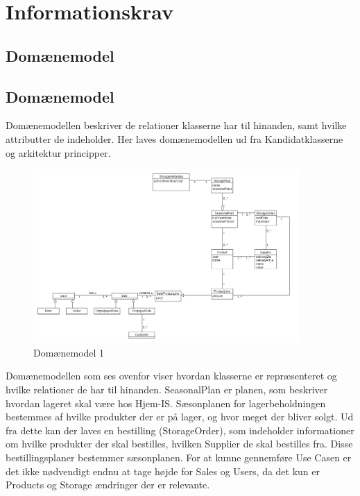 \section{Informationskrav}\label{sec:informations-krav}

\subsection{Domænemodel}

\subsection{Domænemodel}\label{Domainmodel}
Domænemodellen beskriver de relationer klasserne har til hinanden, samt hvilke attributter de indeholder. Her laves domænemodellen ud fra Kandidatklasserne og arkitektur principper.

\begin{figure}[H]
    \centering
    \includegraphics[width=0.9\textwidth]{figures/krav/domain_model_1.png}
    \caption{Domænemodel 1}
    \label{fig:domain_model}
\end{figure}

Domænemodellen som ses ovenfor viser hvordan klasserne er repræsenteret og hvilke relationer de har til hinanden. SeasonalPlan er planen, som beskriver hvordan lageret skal være hos Hjem-IS. Sæsonplanen for lagerbeholdningen bestemmes af hvilke produkter der er på lager, og hvor meget der bliver solgt. Ud fra dette kan der laves en bestilling (StorageOrder), som indeholder informationer om hvilke produkter der skal bestilles, hvilken Supplier de skal bestilles fra. Disse bestillingsplaner bestemmer sæsonplanen.
For at kunne gennemføre Use Casen er det ikke nødvendigt endnu at tage højde for Sales og Users, da det kun er Products og Storage ændringer der er relevante. 

